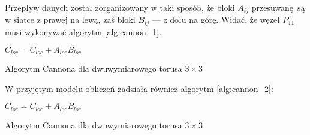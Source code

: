 Przepływ danych został zorganizowany w taki sposób, że bloki \(A_{ij}\) przesuwanę są w siatce z prawej na lewą, zaś bloki \(B_{ij}\) --- z dołu na górę. Widać, że węzeł \(P_{11}\) musi wykonywać algorytm \ref{alg:cannon_1}.

\begin{algorithm}[H]
\centering
\begin{algorithmic}[1]
\State \(C_{loc} = C_{loc} + A_{loc}B_{loc}\)
\EndFor
\end{algorithmic}
\caption{Algorytm Cannona dla dwuwymiarowego torusa \(3\times 3\)}
\label{alg:cannon_1}
\end{algorithm}

\noindent W przyjętym modelu obliczeń zadziała również algorytm \ref{alg:cannon_2}:

\begin{algorithm}[H]
\centering
\begin{algorithmic}[1]
\State \(C_{loc} = C_{loc} + A_{loc}B_{loc}\)
\EndFor
\end{algorithmic}
\caption{Algorytm Cannona dla dwuwymiarowego torusa \(3\times 3\)}
\label{alg:cannon_2}
\end{algorithm}

